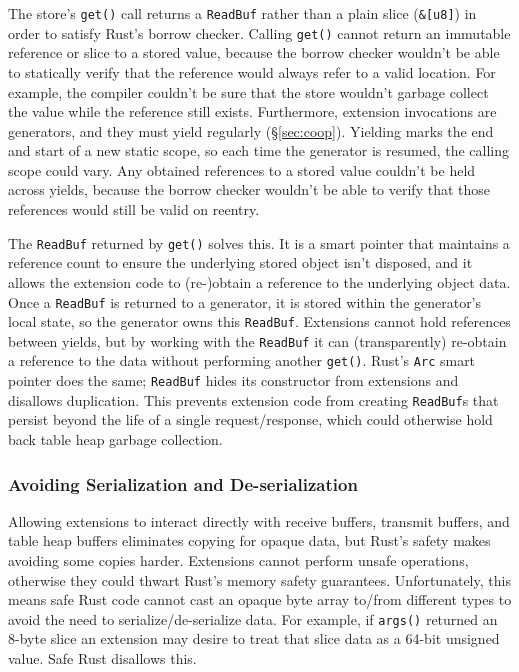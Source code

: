 The store's \texttt{get()} call returns a \texttt{ReadBuf} rather than a plain
  slice (\texttt{\&[u8]}) in order to satisfy Rust's borrow checker.
Calling \texttt{get()} cannot return an immutable reference or slice to a stored
  value, because the borrow checker wouldn't be able to statically verify that the
  reference would always refer to a valid location.
For example, the compiler couldn't be sure that the store wouldn't garbage
  collect the value while the reference still exists.
Furthermore, extension invocations are generators, and they must
  yield regularly (\S\ref{sec:coop}).
Yielding marks the end and start of a new static scope, so
  each time the generator is resumed, the calling scope could vary.
Any obtained references to a stored value couldn't be held across yields,
  because the borrow checker wouldn't be able to verify that those
  references would still be valid on reentry.

The \texttt{ReadBuf} returned by \texttt{get()} solves this.
It is a smart pointer that maintains a reference count to ensure
  the underlying stored object isn't disposed, and it allows the extension code
  to (re-)obtain a reference to the underlying object data.
Once a \texttt{ReadBuf} is returned to a generator, it is stored within the
  generator's local state, so the generator owns this \texttt{ReadBuf}.
Extensions cannot hold references between yields,
  but by working with the \texttt{ReadBuf} it can (transparently) re-obtain a
  reference to the data without performing another \texttt{get()}.
Rust's \texttt{Arc} smart pointer does the same;
  \texttt{ReadBuf} hides its constructor from extensions and disallows duplication.
This prevents extension code from creating \texttt{ReadBuf}s that persist
  beyond the life of a single request/response, which could otherwise hold back
  table heap garbage collection.

\subsubsection{Avoiding Serialization and De-serialization}
\label{sec:ser-des}

Allowing extensions to interact directly with receive buffers, transmit buffers,
  and table heap buffers eliminates copying for opaque data, but Rust's safety
  makes avoiding some copies harder.
Extensions cannot perform unsafe operations, otherwise they could thwart Rust's
  memory safety guarantees.
Unfortunately, this means safe Rust code cannot cast an opaque byte array to/from
  different types to avoid the need to serialize/de-serialize data.
For example, if \texttt{args()} returned an 8-byte slice an extension may desire
  to treat that slice data as a 64-bit unsigned value.
Safe Rust disallows this.

